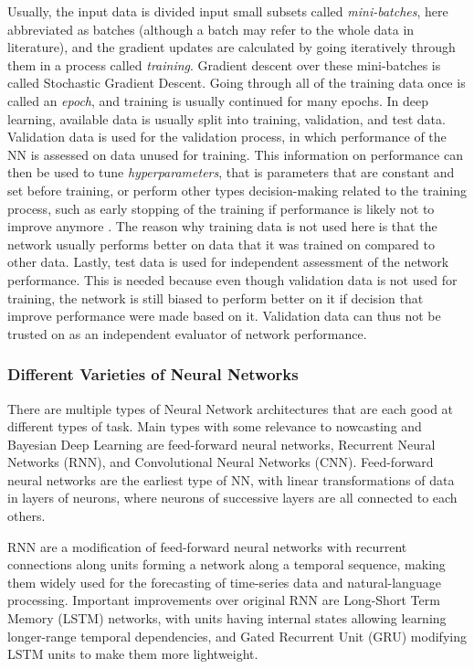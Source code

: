Usually, the input data is divided input small subsets called \textit{mini-batches}, here abbreviated as batches (although a batch may refer to the whole data in literature), and the gradient updates are calculated by going iteratively through them in a process called \textit{training}. Gradient descent over these mini-batches is called Stochastic Gradient Descent. Going through all of the training data once is called an \textit{epoch}, and training is usually continued for many epochs. In deep learning, available data is usually split into training, validation, and test data. Validation data is used for the validation process, in which performance of the NN is assessed on data unused for training. This information on performance can then be used to tune \textit{hyperparameters}, that is parameters that are constant and set before training, or perform other types decision-making related to the training process, such as early stopping of the training if performance is likely not to improve anymore \cite{prechelt1998early}. The reason why training data is not used here is that the network usually performs better on data that it was trained on compared to other data. Lastly, test data is used for independent assessment of the network performance. This is needed because even though validation data is not used for training, the network is still biased to perform better on it if decision that improve performance were made based on it. Validation data can thus not be trusted on as an independent evaluator of network performance. 

\subsubsection*{Different Varieties of Neural Networks}
There are multiple types of Neural Network architectures that are each good at different types of task. Main types with some relevance to nowcasting and Bayesian Deep Learning are feed-forward neural networks, Recurrent Neural Networks (RNN), and Convolutional Neural Networks (CNN). Feed-forward neural networks are the earliest type of NN, with linear transformations of data in layers of neurons, where neurons of successive layers are all connected to each others.

 RNN are a modification of feed-forward neural networks with recurrent connections along units forming a network along a temporal sequence, making them widely used for the forecasting of time-series data and natural-language processing. Important improvements over original RNN are Long-Short Term Memory (LSTM) networks, with units having internal states allowing learning longer-range temporal dependencies, and Gated Recurrent Unit (GRU) modifying LSTM units to make them more lightweight. 

